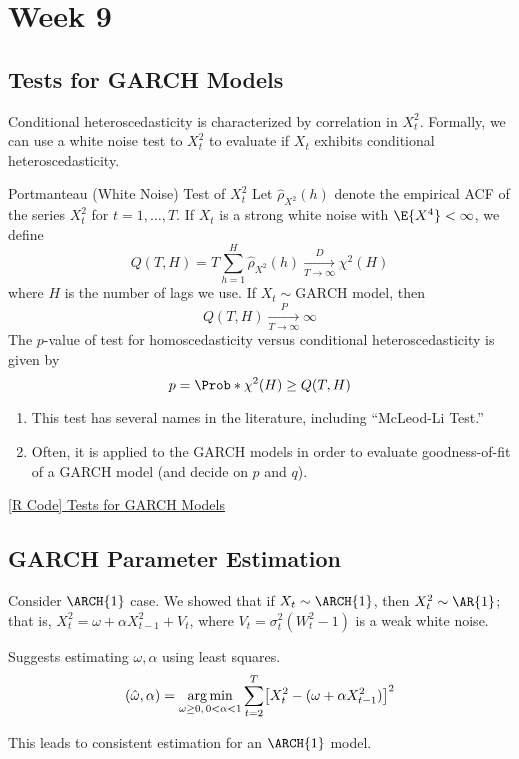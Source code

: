 \chapter{Week 9}
\section{Tests for GARCH Models}
Conditional heteroscedasticity is characterized by
correlation in $ X_t^2 $. Formally,
we can use a white noise test to $ X_t^2 $
to evaluate if $ X_t $ exhibits conditional heteroscedasticity.
\begin{Theorem}{Portmanteau (White Noise) Test of $ X_t^2 $}{}
    Let $ \hat{\rho}_{X^2}(h) $ denote the empirical ACF of the
    series $ X_t^2 $ for $ t=1,\ldots,T $. If $ X_t $
    is a strong white noise with $ \E{X^4}<\infty $, we define
    \[ Q(T,H)=T \sum_{h=1}^{H} \hat{\rho}_{X^2}(h)\xrightarrow[T\to\infty]{D}\chi^2(H) \]
    where $ H $ is the number of lags we use. If $ X_t \sim \text{GARCH} $
    model, then
    \[ Q(T,H)\xrightarrow[T\to\infty]{P}\infty \]
    The $ p $-value of test for homoscedasticity versus conditional
    heteroscedasticity is given by
    \[ p=\Prob*{\chi^2(H)\ge Q(T,H)} \]
\end{Theorem}
\begin{Remark}{}{}
    \begin{enumerate}[(1)]
        \item This test has several names in the literature, including
              ``McLeod-Li Test.''
        \item Often, it is applied to the GARCH models in order to evaluate goodness-of-fit
              of a GARCH model (and decide on $ p $ and $ q $).
    \end{enumerate}
\end{Remark}
\href{https://github.com/Hextical/university-notes/blob/master/year-3/semester-2/STAT%20443/code/9.1%20-%20Tests%20for%20GARCH%20Models.R}{[R Code] Tests for GARCH Models}
\section{GARCH Parameter Estimation}
Consider $ \ARCH{1} $ case. We showed that if $ X_t \sim \ARCH{1} $,
then $ X_t^2 \sim \AR{1} $; that is, $ X_t^2=\omega+\alpha X_{t-1}^2+V_t $,
where $ V_t=\sigma_t^2(W_t^2-1) $ is a weak white noise.

Suggests estimating $ \omega,\alpha $ using least squares.
\[ (\hat{\omega},\alpha)=\operatorname*{arg\,min}_{\omega\ge 0,\, 0<\alpha<1}\sum_{t=2}^{T} \bigl[X_t^2-(\omega+\alpha X_{t-1}^2)\bigr]^2 \]
\begin{Remark}{}{}
    This leads to consistent estimation for an $ \ARCH{1} $ model.
\end{Remark}

